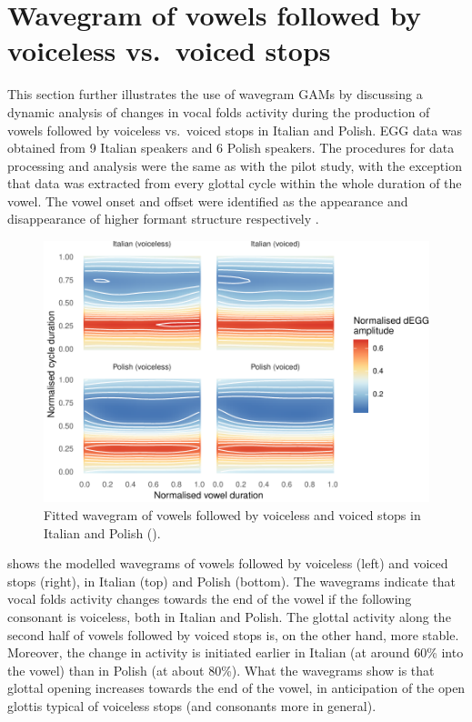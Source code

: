 \documentclass[
  11pt,
  a4paper,
]{article}
\begin{document}
\hypertarget{wavegram-of-vowels-followed-by-voiceless-vs.-voiced-stops}{%
\section{Wavegram of vowels followed by voiceless vs.~voiced
stops}\label{wavegram-of-vowels-followed-by-voiceless-vs.-voiced-stops}}

\label{s:voicing}

This section further illustrates the use of wavegram GAMs by discussing
a dynamic analysis of changes in vocal folds activity during the
production of vowels followed by voiceless vs.~voiced stops in Italian
and Polish. EGG data was obtained from 9 Italian speakers and 6 Polish
speakers. The procedures for data processing and analysis were the same
as with the pilot study, with the exception that data was extracted from
every glottal cycle within the whole duration of the vowel. The vowel
onset and offset were identified as the appearance and disappearance of
higher formant structure respectively \citep{machac2009}.

\begin{figure}
\includegraphics[width=\linewidth]{2019-wavegram_files/figure-latex/surface-1} \caption{Fitted wavegram of vowels followed by voiceless and voiced stops in Italian and Polish ().}\label{f:surface}
\end{figure}

 shows the modelled wavegrams of vowels followed by
voiceless (left) and voiced stops (right), in Italian (top) and Polish
(bottom). The wavegrams indicate that vocal folds activity changes
towards the end of the vowel if the following consonant is voiceless,
both in Italian and Polish. The glottal activity along the second half
of vowels followed by voiced stops is, on the other hand, more stable.
Moreover, the change in activity is initiated earlier in Italian (at
around 60\% into the vowel) than in Polish (at about 80\%). What the
wavegrams show is that glottal opening increases towards the end of the
vowel, in anticipation of the open glottis typical of voiceless stops
(and consonants more in general).
\end{document}
